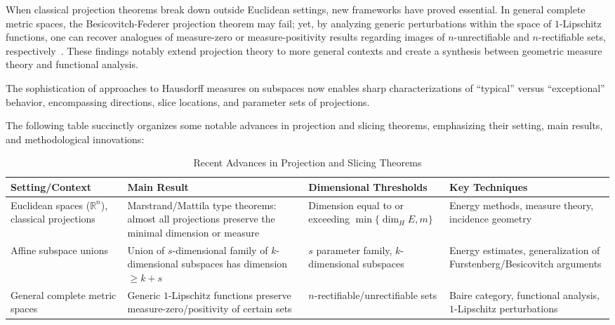 \documentclass[sigconf]{acmart}
\begin{document}
When classical projection theorems break down outside Euclidean settings, new frameworks have proved essential. In general complete metric spaces, the Besicovitch-Federer projection theorem may fail; yet, by analyzing generic perturbations within the space of $1$-Lipschitz functions, one can recover analogues of measure-zero or measure-positivity results regarding images of $n$-unrectifiable and $n$-rectifiable sets, respectively~\cite{ref21}. These findings notably extend projection theory to more general contexts and create a synthesis between geometric measure theory and functional analysis.

The sophistication of approaches to Hausdorff measures on subspaces now enables sharp characterizations of ``typical'' versus ``exceptional'' behavior, encompassing directions, slice locations, and parameter sets of projections. 

The following table succinctly organizes some notable advances in projection and slicing theorems, emphasizing their setting, main results, and methodological innovations:

\begin{table*}[htbp]
\centering
\caption{Recent Advances in Projection and Slicing Theorems}
\label{tab:proj_slice_advances}
\begin{adjustbox}{max width=\textwidth}
\begin{tabular}{llll}
\toprule
\textbf{Setting/Context} & \textbf{Main Result} & \textbf{Dimensional Thresholds} & \textbf{Key Techniques} \\
\midrule
Euclidean spaces ($\mathbb{R}^n$), classical projections & Marstrand/Mattila type theorems: almost all projections preserve the minimal dimension or measure & Dimension equal to or exceeding $\min\{\dim_H E, m\}$ & Energy methods, measure theory, incidence geometry \\
Affine subspace unions & Union of $s$-dimensional family of $k$-dimensional subspaces has dimension $\geq k+s$ & $s$ parameter family, $k$-dimensional subspaces & Energy estimates, generalization of Furstenberg/Besicovitch arguments \\
General complete metric spaces & Generic $1$-Lipschitz functions preserve measure-zero/positivity of certain sets & $n$-rectifiable/unrectifiable sets & Baire category, functional analysis, $1$-Lipschitz perturbations \\
\bottomrule
\end{tabular}
\end{adjustbox}
\end{table*}
\end{document}
